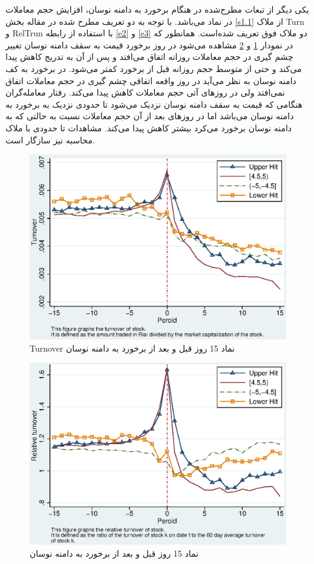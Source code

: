 \documentclass[12pt]{article}
\begin{document}
یکی دیگر از تبعات مطرح‌شده در هنگام برخورد به دامنه نوسان، افزایش حجم معاملات در نماد می‌باشد. با توجه به دو تعریف مطرح شده در مقاله بخش
\ref{s1.1}
از ملاک 
Turn
و
RelTrun
با استفاده از رابطه 
\ref{e2}
و
\ref{e3}
دو ملاک فوق تعریف شده‌است. همانطور که در نمودار 
\ref{g24}
و
\ref{g25}
مشاهده می‌شود در روز برخورد قیمت به سقف دامنه نوسان تغییر چشم گیری در حجم معاملات روزانه اتفاق می‌افتد و پس از آن به تدریج کاهش پیدا می‌کند و حتی از متوسط حجم روزانه قبل از برخورد کمتر می‌شود.
در برخورد به کف دامنه نوسان به نظر می‌آید در روز واقعه اتفاقی چشم گیری در حجم معاملات اتفاق نمی‌افتد ولی در روز‌های آتی حجم معاملات کاهش پیدا می‌کند.
رفتار معامله‌گران هنگامی که قیمت  به سقف دامنه نوسان نزدیک می‌شود  تا حدودی نزدیک به برخورد به دامنه نوسان می‌باشد اما در روز‌های بعد از آن حجم معاملات نسبت به حالتی که به دامنه نوسان برخورد می‌کرد بیشتر کاهش پیدا می‌کند. مشاهدات تا حدودی با ملاک محاسبه 
نیز سازگار است.


\begin{figure}[htbp]
\centering
\includegraphics[width=0.8\columnwidth]{TT.eps}
\caption{Turnover نماد 15 روز قبل و بعد از برخورد به دامنه نوسان}
\label{g24}
\end{figure}

\begin{figure}[htbp]
\centering
\includegraphics[width=0.8\columnwidth]{TRT.eps}
\caption{ نماد 15 روز قبل و بعد از برخورد به دامنه نوسان}
\label{g25}
\end{figure}
\FloatBarrier
\end{document}
